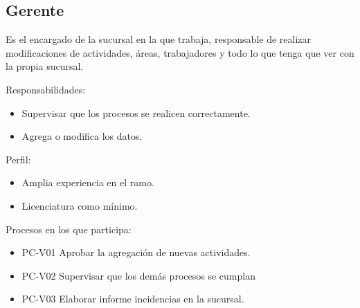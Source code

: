 \begin{Usuario}{\subsection{Gerente}}{
		Es el encargado de la sucursal en la que trabaja, responsable de realizar modificaciones de actividades, áreas, trabajadores y todo lo que tenga que ver con la propia sucursal.
	}
	\item[Responsabilidades:] \cdtEmpty
	\begin{itemize}
		\item Supervisar que los procesos se realicen correctamente.
		\item Agrega o modifica los datos.
	\end{itemize}
	
	\item[Perfil:] \cdtEmpty
	\begin{itemize}
		\item Amplia experiencia en el ramo.
		\item Licenciatura como mínimo.
	\end{itemize}
	\item[Procesos en los que participa:] \cdtEmpty
	\begin{itemize}
		\item PC-V01 Aprobar la agregación de nuevas actividades.
		\item PC-V02 Supervisar que los demás procesos se cumplan
		\item PC-V03 Elaborar informe incidencias en la sucursal.
	\end{itemize}
\end{Usuario}


